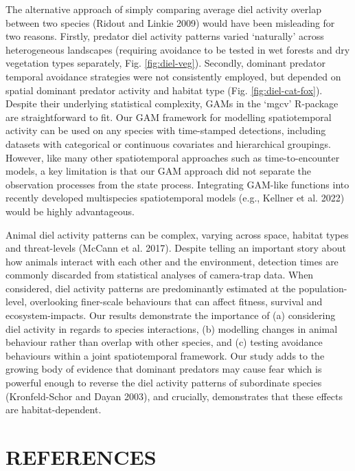 \documentclass[preprint, 3p, authoryear]{elsarticle} %
\begin{document}
The alternative approach of simply comparing average diel activity overlap between two species (Ridout and Linkie 2009) would have been misleading for two reasons. Firstly, predator diel activity patterns varied `naturally' across heterogeneous landscapes (requiring avoidance to be tested in wet forests and dry vegetation types separately, Fig. \ref{fig:diel-veg}). Secondly, dominant predator temporal avoidance strategies were not consistently employed, but depended on spatial dominant predator activity and habitat type (Fig. \ref{fig:diel-cat-fox}). Despite their underlying statistical complexity, GAMs in the `mgcv' R-package are straightforward to fit. Our GAM framework for modelling spatiotemporal activity can be used on any species with time-stamped detections, including datasets with categorical or continuous covariates and hierarchical groupings. However, like many other spatiotemporal approaches such as time-to-encounter models, a key limitation is that our GAM approach did not separate the observation processes from the state process. Integrating GAM-like functions into recently developed multispecies spatiotemporal models (e.g., Kellner et al. 2022) would be highly advantageous.

Animal diel activity patterns can be complex, varying across space, habitat types and threat-levels (McCann et al. 2017). Despite telling an important story about how animals interact with each other and the environment, detection times are commonly discarded from statistical analyses of camera-trap data. When considered, diel activity patterns are predominantly estimated at the population-level, overlooking finer-scale behaviours that can affect fitness, survival and ecosystem-impacts. Our results demonstrate the importance of (a) considering diel activity in regards to species interactions, (b) modelling changes in animal behaviour rather than overlap with other species, and (c) testing avoidance behaviours within a joint spatiotemporal framework. Our study adds to the growing body of evidence that dominant predators may cause fear which is powerful enough to reverse the diel activity patterns of subordinate species (Kronfeld-Schor and Dayan 2003), and crucially, demonstrates that these effects are habitat-dependent.

\newpage

\hypertarget{references}{%
\section*{REFERENCES}\label{references}}
\end{document}

